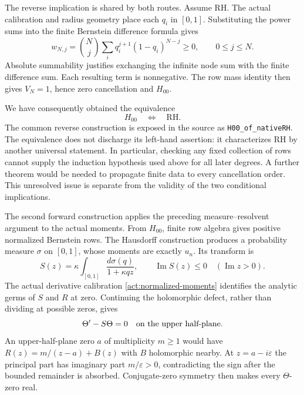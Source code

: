 The reverse implication is shared by both routes. Assume RH. The actual
calibration and radius geometry place each $q_i$ in $[0,1]$. Substituting
the power sums into the finite Bernstein difference formula gives
\begin{equation}\label{act:positive-spectral-weights}
 w_{N,j}=\binom Nj\sum_iq_i^{j+1}(1-q_i)^{N-j}\ge0,
 \qquad 0\le j\le N.
\end{equation}
Absolute summability justifies exchanging the infinite node sum with
the finite difference sum. Each resulting term is nonnegative. The row
mass identity then gives $V_N=1$, hence zero cancellation and $H_{00}$.

We have consequently obtained the equivalence
\begin{equation}\label{act:first-equivalence}
 H_{00}\quad\Longleftrightarrow\quad\mathrm{RH}.
\end{equation}
The common reverse construction is exposed in the source as
\texttt{H00\_of\_nativeRH}. The equivalence does not discharge its
left-hand assertion: it characterizes RH by another universal statement.
In particular, checking any fixed collection of rows cannot supply the
induction hypothesis used above for all later degrees. A further theorem
would be needed to propagate finite data to every cancellation order.
This unresolved issue is separate from the validity of the two
conditional implications.

\label{act:route-two}
The second forward construction applies the preceding measure--resolvent
argument to the actual moments. From $H_{00}$, finite row algebra gives
positive normalized Bernstein rows. The Hausdorff construction produces
a probability measure $\sigma$ on $[0,1]$, whose moments are exactly $u_n$.
Its transform is
\begin{equation}\label{act:actual-resolvent}
 S(z)=\kappa\int_{[0,1]}\frac{d\sigma(q)}{1+\kappa qz},
 \qquad \operatorname{Im}S(z)\le0\quad(\operatorname{Im}z>0).
\end{equation}
The actual derivative calibration \eqref{act:normalized-moments} identifies
the analytic germs of $S$ and $R$ at zero. Continuing the holomorphic
defect, rather than dividing at possible zeros, gives
\begin{equation}\label{act:actual-defect}
 \Theta'-S\Theta=0\quad\hbox{on the upper half-plane}.
\end{equation}
An upper-half-plane zero $a$ of multiplicity $m\ge1$ would have
$R(z)=m/(z-a)+B(z)$ with $B$ holomorphic nearby. At $z=a-i\varepsilon$
the principal part has imaginary part $m/\varepsilon>0$, contradicting
the sign after the bounded remainder is absorbed. Conjugate-zero symmetry
then makes every $\Theta$-zero real.

